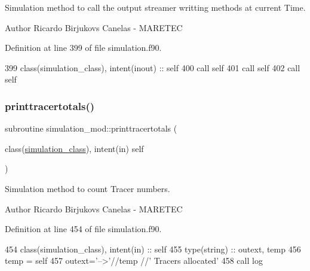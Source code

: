 Simulation method to call the output streamer writting methods at current Time. 

\begin{DoxyAuthor}{Author}
Ricardo Birjukovs Canelas -\/ M\+A\+R\+E\+T\+EC 
\end{DoxyAuthor}


Definition at line 399 of file simulation.\+f90.


\begin{DoxyCode}
399     \textcolor{keywordtype}{class}(simulation\_class), \textcolor{keywordtype}{intent(inout)} :: self
400     \textcolor{keyword}{call }self%
401     \textcolor{keyword}{call }self%
402     \textcolor{keyword}{call }self%
\end{DoxyCode}
\mbox{\label{namespacesimulation__mod_aba126a8e0575cabb3bef6ab395002b3c}} 
\subsubsection{\texorpdfstring{printtracertotals()}{printtracertotals()}}
{\footnotesize\ttfamily subroutine simulation\+\_\+mod\+::printtracertotals (\begin{DoxyParamCaption}\item[{class(\mbox{\hyperlink{structsimulation__mod_1_1simulation__class}{simulation\+\_\+class}}), intent(in)}]{self }\end{DoxyParamCaption})\hspace{0.3cm}{\ttfamily [private]}}



Simulation method to count Tracer numbers. 

\begin{DoxyAuthor}{Author}
Ricardo Birjukovs Canelas -\/ M\+A\+R\+E\+T\+EC 
\end{DoxyAuthor}


Definition at line 454 of file simulation.\+f90.


\begin{DoxyCode}
454     \textcolor{keywordtype}{class}(simulation\_class), \textcolor{keywordtype}{intent(in)} :: self
455     \textcolor{keywordtype}{type}(string) :: outext, temp
456     temp = self%
457     outext=\textcolor{stringliteral}{'-->'}//temp //\textcolor{stringliteral}{' Tracers allocated'}
458     \textcolor{keyword}{call }log%
\end{DoxyCode}
\mbox{\label{namespacesimulation__mod_a73bd78c4ac76c51f1e10f5847c25c4df}} 

